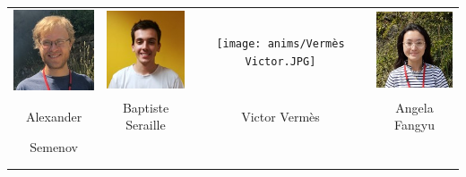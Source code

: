 \begin{center}
\begin{tabular}{cccc}
\includegraphics[angle=0,origin=c, width=27mm]{anims/Semenov Alexander.JPG} &
\includegraphics[angle=0,origin=c, width=27mm]{anims/Seraille Baptiste.jpg} &
\texttt{[image: anims/Vermès Victor.JPG]} &
\includegraphics[origin=c, width=27mm]{anims/Fangyu Angela.jpg} \\
Alexander & Baptiste Seraille & Victor Vermès & Angela Fangyu \\ Semenov & & \\ \\ \\ 

\end{tabular}
\end{center}